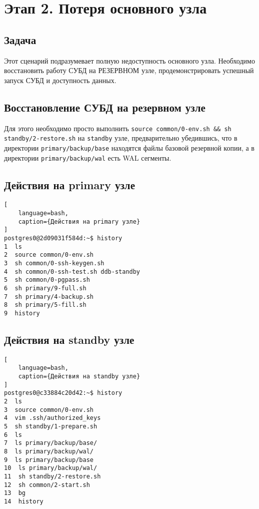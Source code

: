 \documentclass{article}
\begin{document}
\section{Этап 2. Потеря основного узла}

\subsection{Задача}

Этот сценарий подразумевает полную недоступность основного узла. Необходимо восстановить работу СУБД на РЕЗЕРВНОМ узле, продемонстрировать успешный запуск СУБД и доступность данных.

\subsection{Восстановление СУБД на резервном узле}

Для этого необходимо просто выполнить 
\texttt{source common/0-env.sh \&\& sh standby/2-restore.sh} 
на \texttt{standby} узле, предварительно убедившись, что в 
директории \texttt{primary/backup/base} находятся файлы базовой резервной копии,
а в директории \texttt{primary/backup/wal} есть WAL сегменты.



\subsection{Действия на primary узле}

\begin{lstlisting}[
    language=bash,
    caption={Действия на primary узле}
]
postgres0@2d09031f584d:~$ history
1  ls
2  source common/0-env.sh 
3  sh common/0-ssh-keygen.sh 
4  sh common/0-ssh-test.sh ddb-standby
5  sh common/0-pgpass.sh 
6  sh primary/9-full.sh 
7  sh primary/4-backup.sh 
8  sh primary/5-fill.sh 
9  history
\end{lstlisting}

\subsection{Действия на standby узле}

\begin{lstlisting}[
    language=bash,
    caption={Действия на standby узле}
]
postgres0@c33884c20d42:~$ history
2  ls
3  source common/0-env.sh
4  vim .ssh/authorized_keys 
5  sh standby/1-prepare.sh 
6  ls
7  ls primary/backup/base/
8  ls primary/backup/wal/
9  ls primary/backup/base
10  ls primary/backup/wal/
11  sh standby/2-restore.sh 
12  sh common/2-start.sh 
13  bg
14  history
\end{lstlisting}
\end{document}

